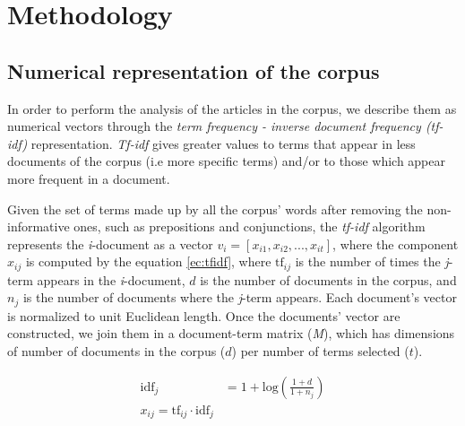 
\section{Methodology} 

\label{sec:Methodology}

\subsection{Numerical representation of the corpus}

\par In order to perform the analysis of the articles in the corpus, we describe them as numerical vectors through the \textit{term frequency - inverse document frequency (tf-idf)} representation. \textit{Tf-idf} gives greater values to terms that appear in less documents of the corpus (i.e more specific terms) and/or to those which appear more frequent in a document.

\par Given the set of terms made up by all the corpus' words after removing the non-informative ones, such as prepositions and conjunctions, the \textit{tf-idf} algorithm represents the \textit{i}-document as a vector $v_i = [x_{i1}, x_{i2}, ... , x_{it}]$, where the component $x_{ij}$ is computed by the equation \ref{ec:tfidf}, where $\textrm{tf}_{ij}$ is the number of times the \textit{j}-term appears in the \textit{i}-document, $d$ is the number of documents in the corpus, and $n_j$ is the number of documents where the \textit{j}-term appears. Each document's vector is normalized to unit Euclidean length.
Once the documents' vector are constructed, we join them in a document-term matrix (\emph{M}), which has dimensions of number of documents in the corpus ($d$) per number of terms selected ($t$).

\begin{center}
\begin{equation}
\begin{split}
\text{idf}_{j} & = 1 + \textrm{log}(\frac{1 + d}{1 + n_j}) \\
x_{ij} = \textrm{tf}_{ij} \cdot \textrm{idf}_{j}
\end{split}
\label{ec:tfidf}
\end{equation}
\end{center}

